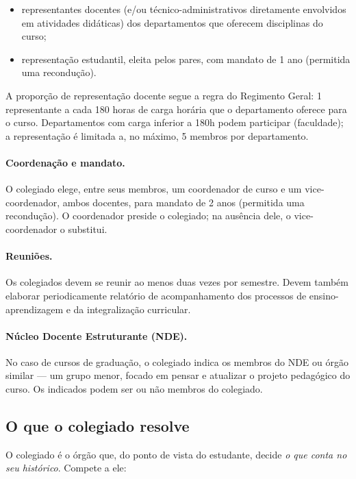 \documentclass[10pt,a4paper]{extarticle}
\newcommand{\impt}[1]{\textcolor{important}{#1}}
\begin{document}
\begin{itemize}
    \item \impt{representantes docentes} (e/ou técnico-administrativos diretamente envolvidos em atividades didáticas) dos departamentos que oferecem disciplinas do curso;
    \item \impt{representação estudantil}, eleita pelos pares, com mandato de 1 ano (permitida uma recondução).
\end{itemize}

A proporção de representação docente segue a regra do Regimento Geral: \impt{1 representante a cada 180 horas} de carga horária que o departamento oferece para o curso. Departamentos com carga inferior a 180h podem participar (faculdade); a representação é limitada a, no máximo, \impt{5 membros por departamento}.

\paragraph{Coordenação e mandato.} O colegiado elege, entre seus membros, um \impt{coordenador de curso} e um \impt{vice-coordenador}, ambos docentes, para mandato de \impt{2 anos} (permitida uma recondução). O coordenador preside o colegiado; na ausência dele, o vice-coordenador o substitui.

\paragraph{Reuniões.} Os colegiados devem se reunir \impt{ao menos duas vezes por semestre}. Devem também elaborar periodicamente relatório de acompanhamento dos processos de ensino-aprendizagem e da \impt{integralização curricular}.

\paragraph{Núcleo Docente Estruturante (NDE).} No caso de cursos de graduação, o colegiado indica os membros do \impt{NDE} ou órgão similar --- um grupo menor, focado em pensar e atualizar o projeto pedagógico do curso. Os indicados podem ser ou não membros do colegiado.

\subsection{O que o colegiado resolve}

O colegiado é o órgão que, do ponto de vista do estudante, decide \emph{o que conta no seu histórico}. Compete a ele:
\end{document}
